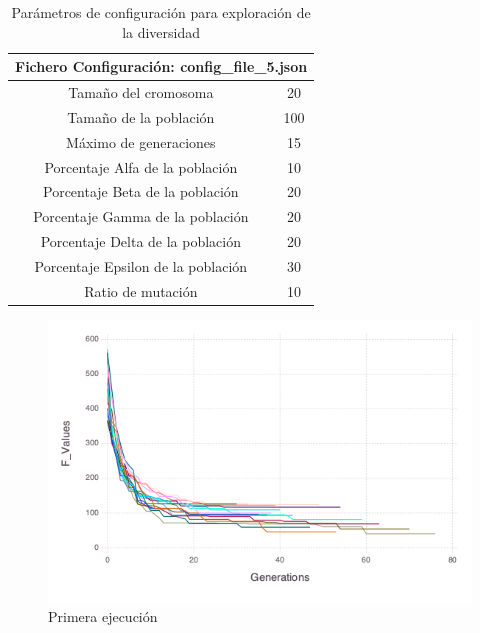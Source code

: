 \begin{table}[]
    \centering
    \begin{tabular}{||c|c||}
        \hline
        \multicolumn{2}{|l|}{\textbf{Fichero Configuración: config\_file\_5.json}} \\ \hline
        Tamaño del cromosoma                            & 20              \\ \hline
        Tamaño de la población                          & 100             \\ \hline
        Máximo de generaciones                          & 15              \\ \hline
        Porcentaje Alfa de la población                 & 10              \\ \hline
        Porcentaje Beta de la población                 & 20              \\ \hline
        Porcentaje Gamma de la población                & 20              \\ \hline
        Porcentaje Delta de la población                & 20              \\ \hline
        Porcentaje Epsilon de la población              & 30              \\ \hline
        Ratio de mutación                               & 10              \\ \hline
    \end{tabular}
    \caption{Parámetros de configuración para exploración de la diversidad}
    \label{tab:diversity_config}
\end{table}

\begin{figure}[H]
	\centering	
	\includegraphics[scale=0.6]{figuras/config_file_5_Rastrigin.png}
	\caption{Primera ejecución}
    \label{fig:primera_ejecucion}
\end{figure}

